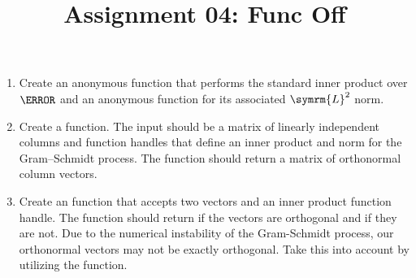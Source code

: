\documentclass{article}
\title{Assignment 04: Func Off}
\begin{document}
\renderTitle

\begin{enumerate}[leftmargin=*]
	\item
		Create an  anonymous function that performs
		the standard inner product over \(\C\) and an
		 anonymous function for its associated
		\(\symrm{L}^2\) norm.

	\item
		Create a  function.  The input
		should be a matrix of linearly independent columns and
		function handles that define an inner product and norm
		for the Gram–Schmidt process.  The function should
		return a matrix of orthonormal column vectors.

	\item
		Create an  function that accepts
		two vectors and an inner product function handle.  The
		function should return  if the vectors
		are orthogonal and  if they are not.
		Due to the numerical instability of the Gram-Schmidt
		process, our orthonormal vectors may not be exactly
		orthogonal.  Take this into account by utilizing the
		 function.
\end{enumerate}
\end{document}
